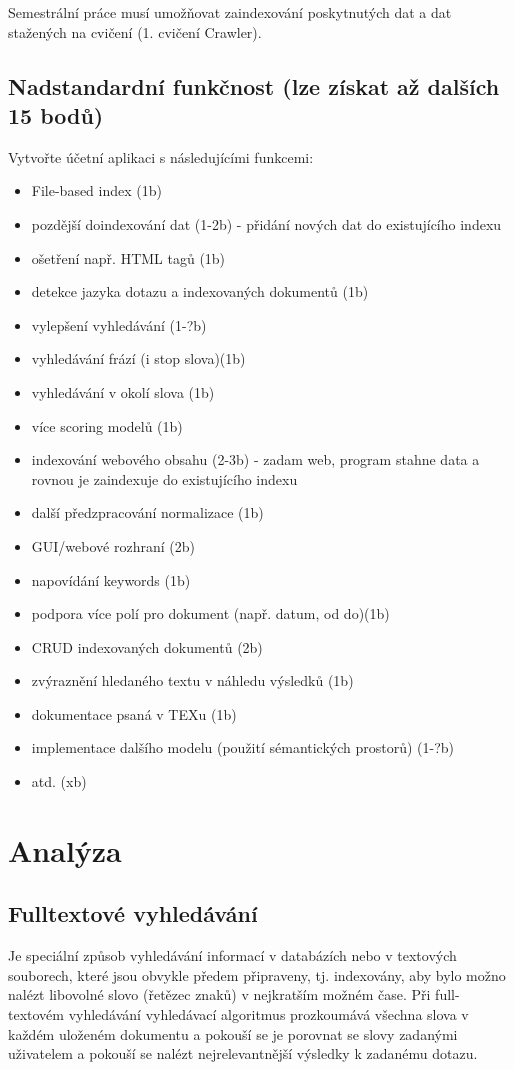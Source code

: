 \documentclass[12pt, a4paper]{article}
\begin{document}
Semestrální práce musí umožňovat zaindexování poskytnutých dat a dat stažených na cvičení (1. cvičení Crawler).

\subsection{Nadstandardní funkčnost (lze získat až dalších 15 bodů)}
Vytvořte účetní aplikaci s následujícími funkcemi:
\begin{itemize}
	\item File-based index (1b)
	\item pozdější doindexování dat (1-2b) - přidání nových dat do existujícího indexu
	\item ošetření např. HTML tagů (1b)
	\item detekce jazyka dotazu a indexovaných dokumentů (1b)
	\item vylepšení vyhledávání (1-?b)
	\item vyhledávání frází (i stop slova)(1b)
	\item vyhledávání v okolí slova (1b)
	\item více scoring modelů (1b)
	\item indexování webového obsahu (2-3b) - zadam web, program stahne data a rovnou je zaindexuje do existujícího indexu
	\item další předzpracování normalizace (1b)
	\item GUI/webové rozhraní (2b)
	\item napovídání keywords (1b)
	\item podpora více polí pro dokument (např. datum, od do)(1b)
	\item CRUD indexovaných dokumentů (2b)
	\item zvýraznění hledaného textu v náhledu výsledků (1b)
	\item dokumentace psaná v TEXu (1b)
	\item implementace dalšího modelu (použití sémantických prostorů) (1-?b)
	\item atd. (xb)
\end{itemize}

\newpage
\section{Analýza}

\subsection{Fulltextové vyhledávání}
\noindent Je speciální způsob vyhledávání informací v databázích nebo v textových souborech, které jsou obvykle předem připraveny, tj. indexovány, aby bylo možno nalézt libovolné slovo (řetězec znaků) v nejkratším možném čase. Při full-textovém vyhledávání vyhledávací algoritmus prozkoumává všechna slova v každém uloženém dokumentu a pokouší se je porovnat se slovy zadanými uživatelem a pokouší se nalézt nejrelevantnější výsledky k zadanému dotazu.
\end{document}
